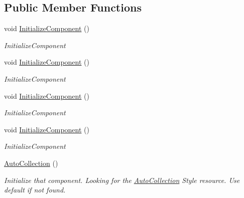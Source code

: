 \subsection*{Public Member Functions}
\begin{DoxyCompactItemize}
\item 
void \mbox{\hyperlink{class_wpf_handler_1_1_u_i_1_1_controls_1_1_auto_collection_a625f859b619ad02bc4943b8086a95dfd}{Initialize\+Component}} ()
\begin{DoxyCompactList}\small\item\em Initialize\+Component \end{DoxyCompactList}\item 
void \mbox{\hyperlink{class_wpf_handler_1_1_u_i_1_1_controls_1_1_auto_collection_a625f859b619ad02bc4943b8086a95dfd}{Initialize\+Component}} ()
\begin{DoxyCompactList}\small\item\em Initialize\+Component \end{DoxyCompactList}\item 
void \mbox{\hyperlink{class_wpf_handler_1_1_u_i_1_1_controls_1_1_auto_collection_a625f859b619ad02bc4943b8086a95dfd}{Initialize\+Component}} ()
\begin{DoxyCompactList}\small\item\em Initialize\+Component \end{DoxyCompactList}\item 
void \mbox{\hyperlink{class_wpf_handler_1_1_u_i_1_1_controls_1_1_auto_collection_a625f859b619ad02bc4943b8086a95dfd}{Initialize\+Component}} ()
\begin{DoxyCompactList}\small\item\em Initialize\+Component \end{DoxyCompactList}\item 
\mbox{\hyperlink{class_wpf_handler_1_1_u_i_1_1_controls_1_1_auto_collection_a8bc71a7c43dfeca1d6ff113b12088c28}{Auto\+Collection}} ()
\begin{DoxyCompactList}\small\item\em Initialize that component. Looking for the {\ttfamily \mbox{\hyperlink{class_wpf_handler_1_1_u_i_1_1_controls_1_1_auto_collection}{Auto\+Collection}}} Style resource. Use default if not found. \end{DoxyCompactList}\end{DoxyCompactItemize}
